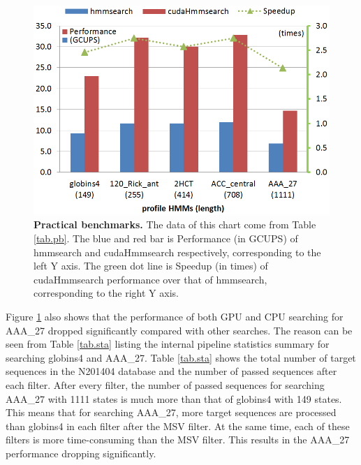 \begin{figure}[!htb]
	\centering
	\includegraphics[totalheight=0.36\textheight]{Figures/lengths.png}
	\caption{\selectfont \textbf{Practical benchmarks.} The data of this chart come from Table \ref{tab.pb}. The blue and red bar is Performance (in GCUPS) of hmmsearch and cudaHmmsearch respectively, corresponding to the left Y axis. The green dot line is Speedup (in times) of cudaHmmsearch performance over that of hmmsearch, corresponding to the right Y axis.}
	\label{fig:len}
\end{figure}

Figure \ref{fig:len} also shows that the performance of both GPU and CPU searching for AAA\_27 dropped significantly compared with other searches. The reason can be seen from Table \ref{tab.sta} listing the internal pipeline statistics summary for searching globins4 and AAA\_27. Table \ref{tab.sta} shows the total number of target sequences in the N201404 database and the number of passed sequences after each filter. After every filter, the number of passed sequences for searching AAA\_27 with 1111 states is much more than that of globins4 with 149 states. This means that for searching AAA\_27, more target sequences are processed than globins4 in each filter after the MSV filter. At the same time, each of these filters is more time-consuming than the MSV filter. This results in the AAA\_27 performance dropping significantly.


